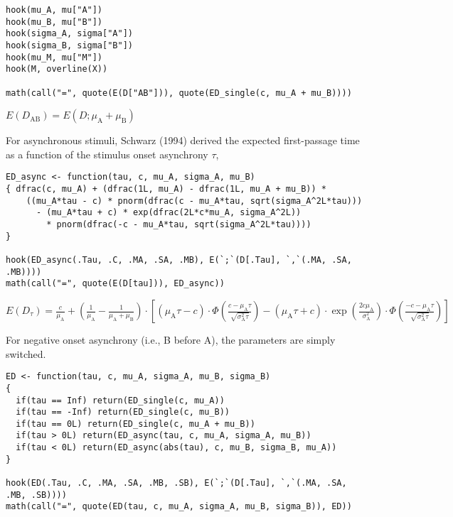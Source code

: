 \begin{verbatim}
hook(mu_A, mu["A"])
hook(mu_B, mu["B"])
hook(sigma_A, sigma["A"])
hook(sigma_B, sigma["B"])
hook(mu_M, mu["M"])
hook(M, overline(X))

math(call("=", quote(E(D["AB"])), quote(ED_single(c, mu_A + mu_B))))
\end{verbatim}

\({E{\left({D}_{\mathrm{AB}}\right)}}{=}{E{\left({D}{;}{{{\mu}_{\mathrm{A}}}{+}{{\mu}_{\mathrm{B}}}}\right)}}\)

For asynchronous stimuli, Schwarz (1994) derived the expected
first-passage time as a function of the stimulus onset asynchrony
\(\tau\),

\begin{verbatim}
ED_async <- function(tau, c, mu_A, sigma_A, mu_B)
{ dfrac(c, mu_A) + (dfrac(1L, mu_A) - dfrac(1L, mu_A + mu_B)) *
    ((mu_A*tau - c) * pnorm(dfrac(c - mu_A*tau, sqrt(sigma_A^2L*tau)))
      - (mu_A*tau + c) * exp(dfrac(2L*c*mu_A, sigma_A^2L))
        * pnorm(dfrac(-c - mu_A*tau, sqrt(sigma_A^2L*tau))))
}

hook(ED_async(.Tau, .C, .MA, .SA, .MB), E(`;`(D[.Tau], `,`(.MA, .SA, .MB))))
math(call("=", quote(E(D[tau])), ED_async))
\end{verbatim}

\({E{\left({D}_{\tau}\right)}}{=}{{\displaystyle{\frac{c}{{\mu}_{\mathrm{A}}}}}{+}{{\left({\displaystyle{\frac{1}{{\mu}_{\mathrm{A}}}}}{-}{\displaystyle{\frac{1}{{{\mu}_{\mathrm{A}}}{+}{{\mu}_{\mathrm{B}}}}}}\right)}{\cdot}{\left[{{\left({{{\mu}_{\mathrm{A}}}{{}}{\tau}}{-}{c}\right)}{\cdot}{\Phi{\left(\displaystyle{\frac{{c}{-}{{{\mu}_{\mathrm{A}}}{{}}{\tau}}}{\sqrt{{{\sigma}_{\mathrm{A}}^{2}}{{}}{\tau}}}}\right)}}}{-}{{{\left({{{\mu}_{\mathrm{A}}}{{}}{\tau}}{+}{c}\right)}{\cdot}{\exp{\left(\displaystyle{\frac{{{2}{{}}{c}}{{}}{{\mu}_{\mathrm{A}}}}{{\sigma}_{\mathrm{A}}^{2}}}\right)}}}{\cdot}{\Phi{\left(\displaystyle{\frac{{{-}{c}}{-}{{{\mu}_{\mathrm{A}}}{{}}{\tau}}}{\sqrt{{{\sigma}_{\mathrm{A}}^{2}}{{}}{\tau}}}}\right)}}}\right]}}}\)

For negative onset asynchrony (i.e., B before A), the parameters are
simply switched.

\begin{verbatim}
ED <- function(tau, c, mu_A, sigma_A, mu_B, sigma_B)
{
  if(tau == Inf) return(ED_single(c, mu_A))
  if(tau == -Inf) return(ED_single(c, mu_B))
  if(tau == 0L) return(ED_single(c, mu_A + mu_B))
  if(tau > 0L) return(ED_async(tau, c, mu_A, sigma_A, mu_B))
  if(tau < 0L) return(ED_async(abs(tau), c, mu_B, sigma_B, mu_A))
}

hook(ED(.Tau, .C, .MA, .SA, .MB, .SB), E(`;`(D[.Tau], `,`(.MA, .SA, .MB, .SB))))
math(call("=", quote(ED(tau, c, mu_A, sigma_A, mu_B, sigma_B)), ED))
\end{verbatim}

